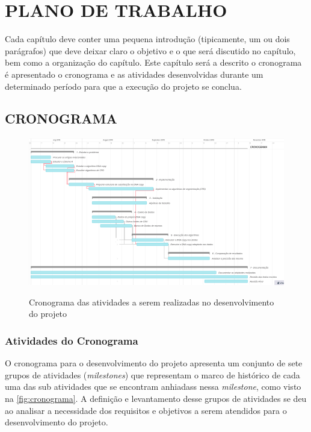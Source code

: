
\chapter{PLANO DE TRABALHO}
\label{chap:planoDeTrabalho}

Cada capítulo deve conter uma pequena introdução (tipicamente, um ou dois parágrafos) que deve deixar claro o objetivo e o que será discutido no capítulo, bem como a organização do capítulo.
Este capítulo será a descrito o cronograma 
 é apresentado o cronograma e as atividades desenvolvidas durante um determinado período para que a execução do projeto se conclua.

\section{CRONOGRAMA}

\begin{figure}[!htb]
    \centering
    \caption{Cronograma das atividades a serem realizadas no desenvolvimento do projeto}
    \includegraphics[width=1\textwidth]{./dados/figuras/cronograma}
    \label{fig:cronograma}
\end{figure}

\subsection{Atividades do Cronograma}

O cronograma para o desenvolvimento do projeto apresenta um conjunto de sete grupos de atividades (\textit{milestones}) que representam o marco de histórico de cada uma das sub atividades que se encontram anhiadass nessa \textit{milestone}, como visto na \autoref{fig:cronograma}. A definição e levantamento desse grupos de atividades se deu ao analisar a necessidade dos requisitos e objetivos a serem atendidos para o desenvolvimento do projeto.


